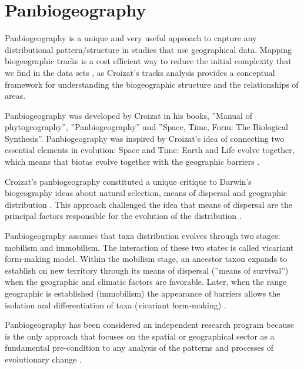 
\section{Panbiogeography}

Panbiogeography is a unique and very useful approach to capture any
distributional pattern/structure in studies that use geographical data. Mapping
biogeographic tracks is a cost efficient way to reduce the initial complexity
that we find in the data sets \citep{Craw1989a}, as Croizat's tracks analysis
\citep{croizat1952, Croizat1958} provides a conceptual
framework for understanding the biogeographic structure and the relationships of
areas.

Panbiogeography was developed by Croizat in his books, ''Manual of
phytogeography''\citep{croizat1952}, ''Panbiogeography''\citep{Croizat1958} and
''Space, Time, Form: The Biological Synthesis''\citep{Croizat1964}.
Panbiogeography was inspired by Croizat's idea of connecting two essential
elements in evolution: Space and Time: Earth and Life evolve together, which
means that biotas evolve together with the geographic barriers
\citep{MorroneCrisci1995, Morrone2000}.

Croizat's panbiogeography constituted a unique critique to Darwin's biogeography
ideas about natural selection, means of dispersal and geographic distribution
\citep{Craw1987}. This approach challenged the idea that means of
dispersal are the principal factors responsible for the evolution of the
distribution \citep{Craw1989b, Crawetal1999}.

Panbiogeography assumes that taxa distribution evolves through two stages:
mobilism and immobilism. The interaction of these two states is called vicariant
form-making model. Within the mobilism stage, an ancestor taxon expands to
establish on new territory through its means of dispersal (''means of
survival'') when the geographic and climatic factors are favorable. Later, when
the range geographic is established (immobilism) the appearance of barriers
allows the isolation and differentiation of taxa (vicariant form-making)
\citep{Grehan1988a, Michaux1989,  Crawetal1999, CrisciMorrone1992a}.

Panbiogeography has been considered an independent research program because is
the only approach that focuses on the spatial or geographical sector as a
fundamental pre-condition to any analysis of the patterns and processes of
evolutionary change \citep{Crawetal1999, Grehan1994, Grehan2001a}.

